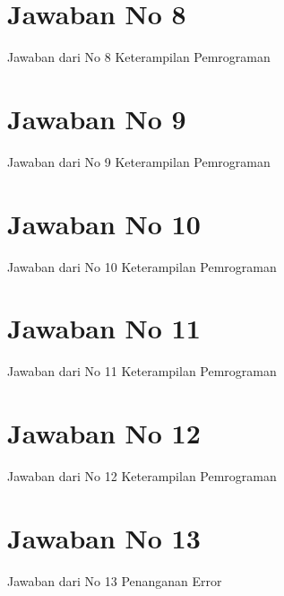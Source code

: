 \documentclass{article}
\begin{document}
\section{Jawaban No 8}
Jawaban dari No 8 Keterampilan Pemrograman

\section{Jawaban No 9}
Jawaban dari No 9 Keterampilan Pemrograman


\newpage
\section{Jawaban No 10}
Jawaban dari No 10 Keterampilan Pemrograman


\newpage
\section{Jawaban No 11}
Jawaban dari No 11 Keterampilan Pemrograman

\section{Jawaban No 12}
Jawaban dari No 12 Keterampilan Pemrograman


\newpage
\section{Jawaban No 13}
Jawaban dari No 13 Penanganan Error

\end{document}
